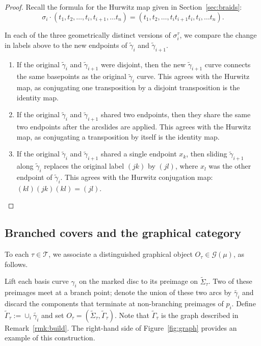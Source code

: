 \documentclass{amsart}
\theoremstyle{definition}
\def\ws{\widetilde{\Sigma}}
\begin{document}
\begin{proof} Recall the formula for the Hurwitz map given in Section~\ref{sec:braids}:
  \[\sigma_i\cdot(t_1, t_2, \dots, t_i, t_{i+1}, \dots t_n)=(t_1, t_2, \dots, t_i t_{i+1} t_i, t_{i}, \dots t_n).\]  
  
 In each of the three geometrically distinct versions of $\sigma_i^\tau$, we compare the change in labels above to the new endpoints of $\widetilde{\gamma}_i$ and $\widetilde{\gamma}_{i+1}$.

\begin{enumerate} 
\item If the original $\widetilde{\gamma}_i$ and $\widetilde{\gamma}_{i+1}$ were disjoint, then the new $\widetilde{\gamma}_{i+1}$ curve connects the same basepoints as the original $\widetilde{\gamma}_i$ curve.  This agrees with the Hurwitz map, as conjugating one transposition by a disjoint transposition is the identity map.  
\item If the original $\widetilde{\gamma}_i$ and $\widetilde{\gamma}_{i+1}$ shared two endpoints, then they share the same two endpoints after the arcslides are applied.  This agrees with the Hurwitz map, as conjugating a transposition by itself is the identity map.  
\item If the original $\widetilde{\gamma}_i$ and $\widetilde{\gamma}_{i+1}$ shared a single endpoint $x_k$, then sliding $\widetilde{\gamma}_{i+1}$ along $\widetilde{\gamma}_i$ replaces the original label $(jk)$ by $(jl)$, where $x_l$ was the other endpoint of $\widetilde{\gamma}_i$.  This agrees with the Hurwitz conjugation map: $(kl)(jk)(kl)=(jl)$. 
\end{enumerate}
\end{proof}



\subsection{Branched covers and the graphical category}


To each $\tau \in\mathcal{T}$, we associate  a distinguished graphical object $O_\tau\in \mathcal{G}(\mu)$, as follows.

Lift each basis curve $\gamma_i$ on the marked disc to its preimage on $\ws_\tau$.   Two of these preimages meet at a branch point; denote the union of these two arcs by $\widetilde{\gamma_i}$ and discard the components that terminate at non-branching preimages of $p_i$.   Define $\widetilde{\Gamma}_\tau:=\cup_i \widetilde{\gamma_i}$ and set $O_\tau=(\ws_\tau, \widetilde{\Gamma}_\tau)$.  Note that $\widetilde{\Gamma}_\tau$ is the graph described in Remark~\ref{rmk:build}.  The right-hand side of Figure~\ref{fig:graph} provides an example of this construction.  
\end{document}
